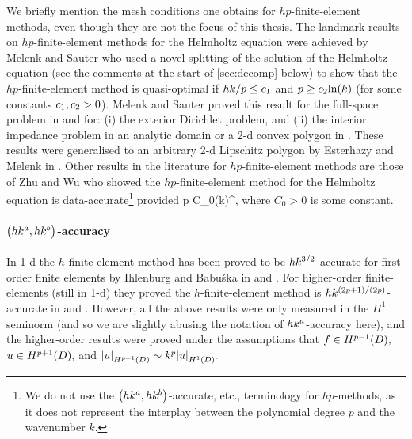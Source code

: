 We briefly mention the mesh conditions one obtains for $hp$-finite-element methods, even though they are not the focus of this thesis. The landmark results on $hp$-finite-element methods for the Helmholtz equation were achieved by Melenk and Sauter \cite{MeSa:10,MeSa:11} who used a novel splitting of the solution of the Helmholtz equation (see the comments at the start of \cref{sec:decomp} below) to show that the $hp$-finite-element method is quasi-optimal if $hk/p \leq c_{1}$ and $p \geq \ct \ln k$ (for some constants $c_{1},c_{2}>0$). Melenk and Sauter proved this result for the full-space problem in \cite{MeSa:10} and for: (i) the exterior Dirichlet problem, and (ii) the interior impedance problem in an analytic domain or a 2-d convex polygon in \cite{MeSa:11}. These results were generalised to an arbitrary 2-d Lipschitz polygon by Esterhazy and Melenk in \cite[Theorem 4.2]{EsMe:12}. Other results in the literature for $hp$-finite-element methods are those of Zhu and Wu \cite[Equation (1.7)]{ZhWu:13} who showed the $hp$-finite-element method for the Helmholtz equation is data-accurate\footnote{We do not use the $\hk{a}b$-accurate, etc., terminology for $hp$-methods, as it does not represent the interplay between the polynomial degree $p$ and the wavenumber $k$.} provided
\beqs
{}p \leq C_0\mleft(k\mright)^{},
\eeqs
where $C_0>0$ is some constant.%
\ere


\paragraph{$\hk{a}b$-accuracy} In 1-d the $h$-finite-element method has been proved to be $hk^{3/2}$-accurate for first-order finite elements by Ihlenburg and Babu\v{s}ka in \cite[Theorem 5 and Equation (3.25)]{IhBa:95a} and \cite[Equation (4.5.15)]{Ih:98}. For higher-order finite-elements (still in 1-d) they proved the $h$-finite-element method is $hk^{(2p+1)/(2p)}$-accurate in \cite[Corollary 3.2]{IhBa:97} and \cite[Theorem 4.27 and Equation 4.7.41]{Ih:98}. However, all the above results were only measured in the $H^1$ seminorm (and so we are slightly abusing the notation of $hk^{a}$-accuracy here), and the higher-order results were proved under the assumptions that $f \in \HpmoD,$ $u \in \HppoD,$ and $\SNHppoD{u} \sim k^p \SNHoD{u}.$

